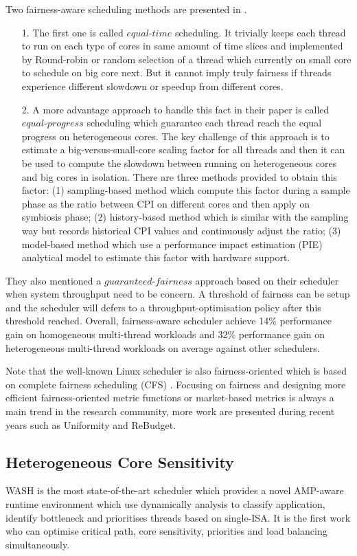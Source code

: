 \documentclass[pageno]{jpaper}
\begin{document}
Two fairness-aware scheduling methods are presented in \cite{van2013fairness}. 
\begin{itemize}
\item[1.] The first one is called $equal$-$time$ scheduling. It trivially keeps each thread to run on each type of cores in same amount of time slices and implemented by Round-robin or random selection of a thread which currently on small core to schedule on big core next. But it cannot imply truly fairness if threads experience different slowdown or speedup from different cores. 
\item[2.] A more advantage approach to handle this fact in their paper is called $equal$-$progress$ scheduling which guarantee each thread reach the equal progress on heterogeneous cores.  The key challenge of this approach is to estimate a big-versus-small-core scaling factor for all threads and then it can be used to compute the slowdown between running on heterogeneous cores and big cores in isolation.  There are three methods provided to obtain this factor: (1) sampling-based method which compute this factor during a sample phase as the ratio between CPI on different cores and then apply on symbiosis phase; (2) history-based method which is similar with the sampling way but records historical CPI values and continuously adjust the ratio; (3) model-based method which use a performance impact estimation (PIE) \cite{van2012scheduling} analytical model to estimate this factor with hardware support.
\end{itemize}
They also mentioned a $guaranteed$-$fairness$ approach based on their scheduler when system throughput need to be concern. A threshold of fairness can be setup and the scheduler will defers to a throughput-optimisation policy after this threshold reached. Overall, fairness-aware scheduler achieve 14\% performance gain on homogeneous multi-thread workloads and 32\% performance gain on heterogeneous multi-thread workloads on average against other schedulers. 

Note that the well-known Linux scheduler is also fairness-oriented which is based on complete fairness scheduling (CFS) \cite{li2009efficient}. Focusing on fairness and designing more efficient fairness-oriented metric functions or market-based metrics is always a main trend in the research community, more work are presented during recent years such as Uniformity \cite{kim2018exploring} and ReBudget\cite{wang2016rebudget}.

\subsection{Heterogeneous Core Sensitivity}
WASH \cite{jibaja2016portable} is the most state-of-the-art scheduler which provides a novel AMP-aware runtime environment which use dynamically analysis to classify application, identify bottleneck and prioritises threads based on single-ISA. It is the first work who can optimise critical path, core sensitivity, priorities and load balancing simultaneously. 
\end{document}
